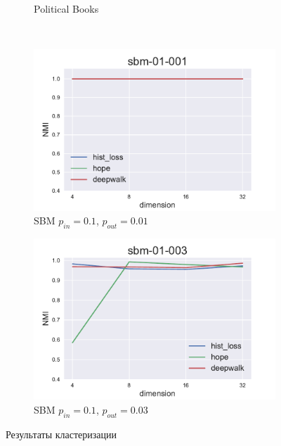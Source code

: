 \documentclass[12pt,a4paper]{extarticle}
\begin{document}
\begin{figure}
\begin{subfigure}{.5\linewidth}
    \caption{Political Books}
    \label{fig:clas_pol}
    \end{subfigure}
    \\[1ex]
    \begin{subfigure}{.5\linewidth}
    \centering
    \includegraphics[width=\linewidth]{src/images/Node_clusterization_sbm-01-001.pdf}
    \caption{SBM $p_{in}=0.1$, $p_{out}=0.01$}
    \label{fig:clus_sbm1}
    \end{subfigure}
    \begin{subfigure}{.5\linewidth}
    \centering
    \includegraphics[width=\linewidth]{src/images/Node_clusterization_sbm-01-003.pdf}
    \caption{SBM $p_{in}=0.1$, $p_{out}=0.03$}
    \label{fig:clus_sbm2}
    \end{subfigure}
    \caption{Результаты кластеризации}
    \label{fig:clus}
    \end{figure}
    
\end{document}
